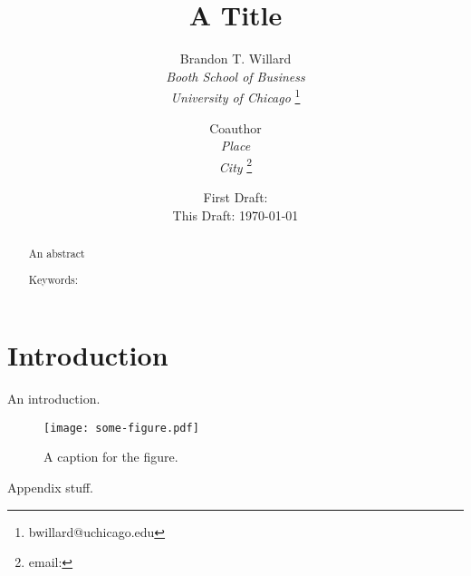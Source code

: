 \documentclass[12pt]{article}
\title{A Title}
\author{
  Brandon T. Willard \\
  \textit{Booth School of Business} \\
  \textit{University of Chicago} 
  \footnote{bwillard@uchicago.edu } 
  \and
  Coauthor \\
  \textit{Place} \\
  \textit{City} 
  \footnote{ email: }
}
\date{
  First Draft: \\
  This Draft: \monthyear\today{}
}
\begin{document}
\maketitle
\begin{abstract}
  \noindent 
  An abstract

  \noindent Keywords: 
\end{abstract}

\newpage
\singlespacing
\section{Introduction}

An introduction.

\begin{figure}[t]
  \begin{center}
  \texttt{[image: some-figure.pdf]}
  \caption{A caption for the figure.} 
  \label{fig:figure_label}
  \end{center}
\end{figure}

\newpage



\begin{appendix}
  Appendix stuff.
\end{appendix}
\end{document}
